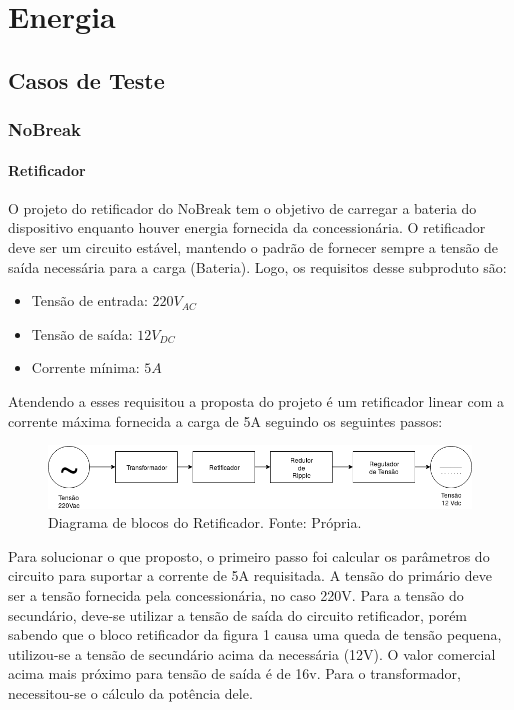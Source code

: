 \chapter[Energia]{Energia}
    \section[Casos de Teste]{Casos de Teste}
        \subsection[NoBreak]{NoBreak}
            \subsubsection[Retificador]{Retificador}
				O projeto do retificador do NoBreak tem o objetivo de carregar a bateria do 					dispositivo enquanto houver energia fornecida da concessionária. O retificador 				deve ser um circuito estável, mantendo o padrão de fornecer sempre a tensão de 				saída necessária para a carga (Bateria). Logo, os requisitos desse subproduto 					são:

                \begin{itemize}
                	\item Tensão de entrada: $220V_{AC}$
                	\item Tensão de saída: $12V_{DC}$
                	\item Corrente mínima: $5A$
                \end{itemize}
		
				Atendendo a esses requisitou a proposta do projeto é um retificador linear com 				a corrente máxima fornecida a carga de 5A seguindo os seguintes passos:
				
                \begin{figure}[!htb]
            		\centering
            		\includegraphics[scale= 0.5]{figuras/Diagrama_Retificador.png}
            		\caption{Diagrama de blocos do Retificador. Fonte: Própria.}
            		\label{diagrama-retificador}
            	\end{figure}
				
				Para solucionar o que proposto, o primeiro passo foi calcular os parâmetros do 				circuito para suportar a corrente de 5A requisitada. A tensão do primário deve 				ser a tensão fornecida pela concessionária, no caso 220V. Para a tensão do 						secundário, deve-se utilizar a tensão de saída do circuito retificador, porém 					sabendo que o bloco retificador da figura 1 causa uma queda de tensão pequena, 				utilizou-se a tensão de secundário acima da necessária (12V). O valor 							comercial acima mais próximo para tensão de saída é de 16v. Para o 								transformador, necessitou-se o cálculo da potência dele.


